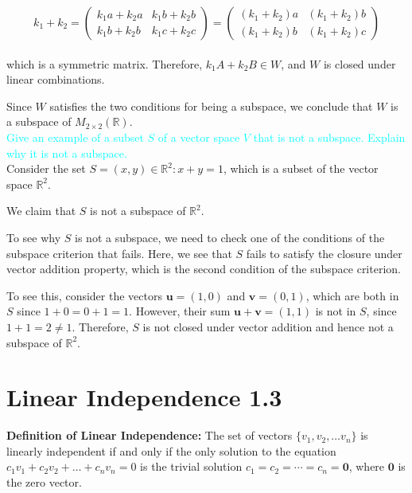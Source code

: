 \documentclass[fontsize=12pt]{scrartcl}
\begin{document}
$$k_1 + k_2 = \left( \begin{array}{cc} k_1a+k_2a & k_1b+k_2b \\k_1b+k_2b & k_1c+k_2c \end{array} \right) = \left( \begin{array}{cc} (k_1+k_2)a & (k_1+k_2)b \\(k_1+k_2)b & (k_1+k_2)c \end{array} \right)$$
\\

which is a symmetric matrix. Therefore, $k_1A+k_2B\in W$, and $W$ is closed under linear combinations.

Since $W$ satisfies the two conditions for being a subspace, we conclude that $W$ is a subspace of $M_{2 \times 2}(\mathbb{R})$.
\\

\noindent
\textcolor{cyan}{Give an example of a subset $S$ of a vector space $V$ that is not a subspace. Explain why it is not a subspace.}\\

Consider the set $S={(x,y)\in \mathbb{R}^2 : x+y=1}$, which is a subset of the vector space $\mathbb{R}^2$.

We claim that $S$ is not a subspace of $\mathbb{R}^2$.

To see why $S$ is not a subspace, we need to check one of the conditions of the subspace criterion that fails. Here, we see that $S$ fails to satisfy the closure under vector addition property, which is the second condition of the subspace criterion.

To see this, consider the vectors $\mathbf{u}=(1,0)$ and $\mathbf{v}=(0,1)$, which are both in $S$ since $1+0=0+1=1$. However, their sum $\mathbf{u}+\mathbf{v}=(1,1)$ is not in $S$, since $1+1=2\neq 1$. Therefore, $S$ is not closed under vector addition and hence not a subspace of $\mathbb{R}^2$.

\section{Linear Independence 1.3}

\noindent
\textbf{Definition of Linear Independence:} The set of vectors $\{ v_1, v_2, \ldots v_n\}$ is linearly independent if and only if the only solution to the equation $c_1v_1+c_2v_2+\ldots + c_nv_n = 0$ is the trivial solution $c_1=c_2=\cdots=c_n=\mathbf{0}$, where $\mathbf{0}$ is the zero vector.\\
\end{document}
